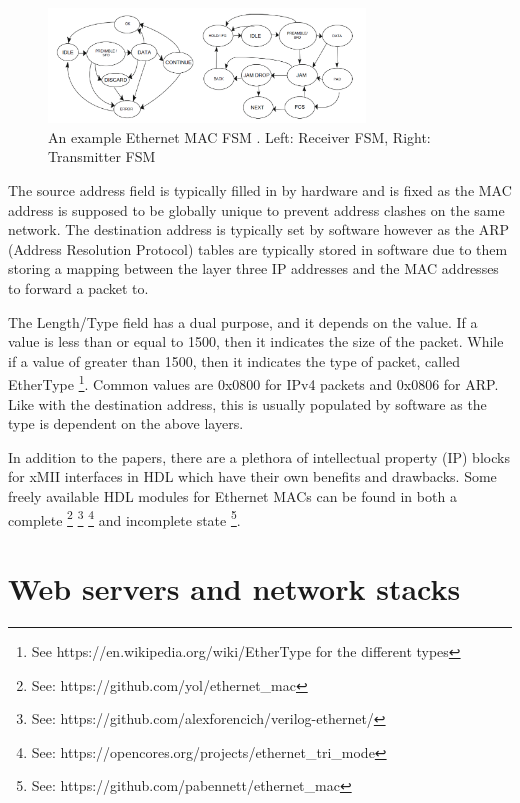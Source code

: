 \begin{figure}[h]
    \centering
    \includegraphics[width=0.75\textwidth]{Images/eth_fsm.png}
    \caption[An example Ethernet MAC FSM]{An example Ethernet MAC FSM \cite{OptimisedEthernetMAC}. Left: Receiver FSM, Right: Transmitter FSM}
    \label{fig:eth_fsm}
\end{figure}

The source address field is typically filled in by hardware and is fixed as the MAC address is supposed to be globally unique to prevent address clashes on the same network. The destination address is typically set by software however as the ARP (Address Resolution Protocol) tables are typically stored in software due to them storing a mapping between the layer three IP addresses and the MAC addresses to forward a packet to. 

The Length/Type field has a dual purpose, and it depends on the value. If a value is less than or equal to 1500, then it indicates the size of the packet. While if a value of greater than 1500, then it indicates the type of packet, called EtherType \footnote[1]{See https://en.wikipedia.org/wiki/EtherType for the different types}. Common values are 0x0800 for IPv4 packets and 0x0806 for ARP. Like with the destination address, this is usually populated by software as the type is dependent on the above layers.


In addition to the papers, there are a plethora of intellectual property (IP) blocks for xMII interfaces in HDL 
which have their own benefits and drawbacks. Some freely available HDL modules for Ethernet MACs can be found in both a complete \footnote[1]{See: https://github.com/yol/ethernet\_mac} \footnote[2]{See: https://github.com/alexforencich/verilog-ethernet/} 
\footnote[3]{See: https://opencores.org/projects/ethernet\_tri\_mode} and incomplete state
\footnote[4]{See: https://github.com/pabennett/ethernet\_mac}.








\section{Web servers and network stacks}




